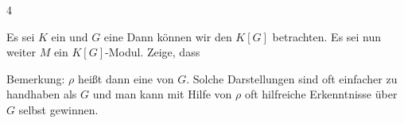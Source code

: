 {4}
{





Es sei $K$ ein
und $G$ eine
Dann können wir den
$K[G]$ betrachten. Es sei nun weiter $M$ ein $K[G]$-Modul. Zeige, dass





}
{Bemerkung: $\rho$ heißt dann eine  {} von $G$. Solche Darstellungen sind oft einfacher zu handhaben als $G$ und man kann mit Hilfe von $\rho$ oft hilfreiche Erkenntnisse über $G$ selbst gewinnen.} {}
